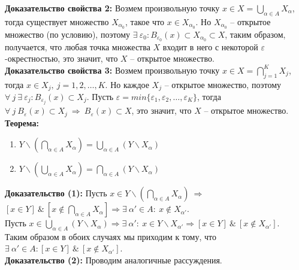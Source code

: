 \documentclass[a4paper,12pt]{article} %
\begin{document}
\noindent \textbf{Доказательство свойства 2:} Возмем произвольную точку $x \in X = \bigcup \limits_{\alpha \in A} X_{\alpha}$, тогда существует множество $X_{\alpha_0}$, такое что $x \in X_{\alpha_0}$. Но $X_{\alpha_0}$ -- открытое множество (по условию), поэтому $\exists ~ \varepsilon_0 : B_{\varepsilon_0}(x) \subset X_{\alpha_0} \subset X$, таким образом, получается, что любая точка множества $X$ входит в него с некоторой $\varepsilon$-окрестностью, это значит, что $X$ -- открытое множество.\\

\noindent \textbf{Доказательство свойства 3:} Возмем произвольную точку $x \in X = \bigcap \limits_{j = 1}^K X_{j}$, тогда $x \in X_j, ~ j = 1, 2, \dots, K$. Но каждое $X_j$ -- открытое множество, поэтому $\forall ~ j ~ \exists ~ \varepsilon_j : B_{\varepsilon_j}(x) \subset X_j$. Пусть $\varepsilon = min \{\varepsilon_1, \varepsilon_2, \dots, \varepsilon_K \}$, тогда $\forall ~ j ~ B_{\varepsilon}(x) \subset X_j ~ \Rightarrow ~ B_{\varepsilon}(x) \subset X$, это значит, что $X$ -- открытое множество.\\

\noindent \textbf{Теорема:}

\begin{enumerate}
    \item $Y \backslash (\bigcap \limits_{\alpha \in A} X_{\alpha}) = \bigcup \limits_{\alpha \in A} (Y \backslash X_{\alpha})$
    \item $Y \backslash (\bigcup \limits_{\alpha \in A} X_{\alpha}) = \bigcap \limits_{\alpha \in A} (Y \backslash X_{\alpha})$
\end{enumerate}

\noindent \textbf{Доказательство (1):} Пусть $x \in Y \backslash \left(\bigcap \limits_{\alpha \in A} X_{\alpha} \right) ~ \Rightarrow$ $[x \in Y] ~ \& ~ \left[x \notin \bigcap \limits_{\alpha \in A} X_{\alpha} \right] \Rightarrow \exists ~ \alpha' \in A : ~ x \notin X_{\alpha'}$.\\

\noindent Пусть $x \in \bigcup \limits_{\alpha \in A} (Y \backslash X_{\alpha}) \Rightarrow \exists ~ \alpha' : ~ x \in Y \backslash X_{\alpha'} \Rightarrow [x \in Y] ~ \& ~ [x \notin X_{\alpha'}]$.\\

\noindent Таким образом в обоих случаях мы приходим к тому, что $\exists ~ \alpha' \in A : [x \in Y] ~ \& ~ [x \notin X_{\alpha'}]$.\\

\noindent \textbf{Доказательство (2):} Проводим аналогичные рассуждения.\\
\end{document}

